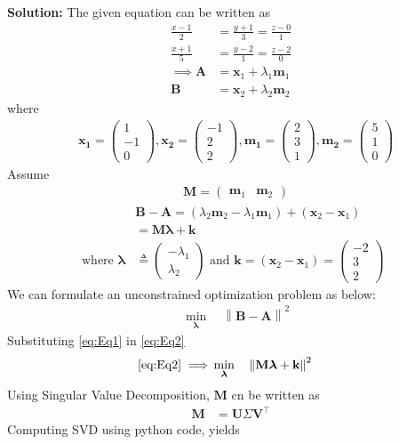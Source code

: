 \documentclass[12pt]{article}
\providecommand{\brak}[1]{\ensuremath{\left(#1\right)}}
\providecommand{\norm}[1]{\left\lVert#1\right\rVert}
\newcommand{\solution}{\noindent \textbf{Solution: }}
\newcommand{\myvec}[1]{\ensuremath{\begin{pmatrix}#1\end{pmatrix}}}
\let\vec\mathbf
\begin{document}
\begin{enumerate}
\solution 
The given equation can be written as
\begin{align}
	\frac{x-1}{2} &= \frac{y+1}{3}=\frac{z-0}{1}\\ 
	\frac{x+1}{5} &= \frac{y-2}{1}= \frac{z-2}{0} \\ 
	\implies 
	\vec{A} &= \vec{x}_1 + \lambda_1\vec{m}_1\\
	\vec{B} &= \vec{x}_2 + \lambda_2\vec{m}_2
\end{align}	
where
\begin{align}
	&\vec{x_1} = \myvec{1\\-1\\0},  
	\vec{x_2} = \myvec{-1\\2\\2},  
	\vec{m_1} = \myvec{2\\3\\1},
	\vec{m_2} = \myvec{5\\1\\0}  
\end{align}	
Assume
\begin{align}
	&\vec{M} = \myvec{\vec{m}_1 & \vec{m}_2} 
\end{align}
\begin{align}
	&\vec{B}-\vec{A} = \brak{\lambda_2\vec{m}_2 - \lambda_1\vec{m}_1} + \brak{\vec{x}_2- \vec{x}_1} \\ 
	\label{eq:Eq1}
	&= \vec{M}\bm{\lambda}+ \vec{k} \\
	\text{ where } \bm{\lambda} &\triangleq \myvec{-\lambda_1\\ \lambda_2}\text{ and }\vec{k} =\brak{\vec{x}_2- \vec{x}_1} = \myvec{-2 \\ 3 \\2}  
\end{align}
We can formulate an unconstrained optimization problem as below:
\begin{align}
	\label{eq:Eq2}
	&  \min_{\bm{\lambda}} \quad \norm{\vec{B}-\vec{A}}^2 
\end{align}
Substituting \eqref{eq:Eq1} in \eqref{eq:Eq2}
\begin{align}
	\label{eq:Eq3}
	\eqref{eq:Eq2} \implies 
	&  \min_{\bm{\lambda}} \quad \norm{\vec{M}\bm{\lambda}+\vec{k}}^2 
\end{align}
Using Singular Value Decomposition, $\vec{M}$ cn be written as
\begin{align}
	\label{eq:svd}
	\vec{M} &= \vec{U}\Sigma\vec{V}^\top 
\end{align}
Computing SVD using python code, yields
\begin{align}

\end{align}
\end{enumerate}
\end{document}
